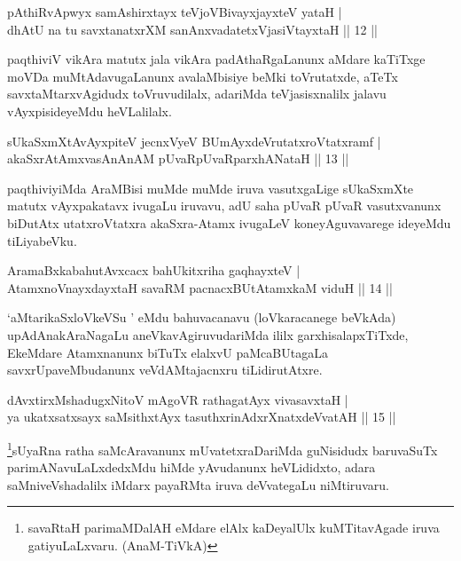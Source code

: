 
\begin{shl}
pAthiRvApwyx samAshirxtayx teVjoV\s BivayxjayxteV yataH |\\
dhAtU na tu savxtanatxrXM sanAnxvadatetxVjasiVtayxtaH \hfill || 12 ||
\end{shl}

\begin{artha}
paqthiviV vikAra matutx jala vikAra padAthaRgaLanunx aMdare kaTiTxge moVDa muMtAdavugaLanunx avalaMbisiye beMki toVrutatxde, aTeTx savxtaMtarxvAgidudx toVruvudilalx, adariMda teVjasisxnalilx jalavu vAyxpisideyeMdu heVLalilalx.
\end{artha}

\begin{shl}
sUkaSxmXtAvAyxpiteV jecnxVyeV BUmAyxdeVrutatxroVtatxramf |\\
akaSxrAtAmxvasAnAnAM pUvaRpUvaRparxhANataH \hfill || 13 ||
\end{shl}

\begin{artha}%
paqthiviyiMda AraMBisi muMde muMde iruva vasutxgaLige sUkaSxmXte matutx vAyxpakatavx ivugaLu iruvavu, adU saha pUvaR pUvaR vasutxvanunx biDutAtx utatxroVtatxra akaSxra-Atamx ivugaLeV koneyAguvavarege ideyeMdu tiLiyabeVku.
\end{artha}

\begin{shl}
AramaBxkabahutAvxcacx bahUkitxriha gaqhayxteV |\\
AtamxnoV\s nayxdayxtaH savaRM pacnacxBUtAtamxkaM viduH \hfill || 14 ||
\end{shl}

\begin{artha}
`aMtarikaSxloVkeVSu ' eMdu bahuvacanavu (loVkaracanege beVkAda) upAdAnakAraNagaLu aneVkavAgiruvudariMda ililx garxhisalapxTiTxde, EkeMdare Atamxnanunx biTuTx elalxvU paMcaBUtagaLa savxrUpaveMbudanunx veVdAMtajacnxru tiLidirutAtxre.
\end{artha}

\begin{shl}
dAvxtirxMshadugxNitoV mAgoVR rathagatAyx vivasavxtaH |\\
ya ukatxsatxsayx saMsithxtAyx tasuthxrinAdxrXnatxdeVvatAH \hfill || 15 ||
\end{shl}

\begin{artha}
\footnote[1]{savaRtaH parimaMDalAH eMdare elAlx kaDeyalUlx kuMTitavAgade iruva gatiyuLaLxvaru. (AnaM-TiVkA)}sUyaRna ratha saMcAravanunx mUvatetxraDariMda guNisidudx baruvaSuTx parimANavuLaLxdedxMdu hiMde yAvudanunx heVLididxto, adara saMniveVshadalilx iMdarx payaRMta iruva deVvategaLu niMtiruvaru.
\end{artha}


